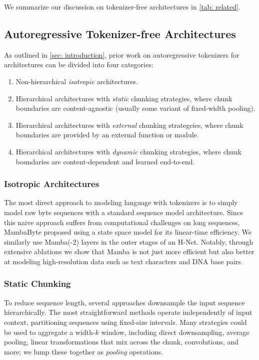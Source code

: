 We summarize our discussion on tokenizer-free architectures in \cref{tab: related}.

\subsection{Autoregressive Tokenizer-free Architectures}
\label{sec:background:ar} 


As outlined in \cref{sec: introduction}, prior work on autoregressive tokenizers for architectures can be divided into four categories:
\begin{enumerate}
    \item Non-hierarchical \emph{isotropic} architectures.
    \item Hierarchical architectures with \emph{static} chunking strategies, where chunk boundaries are content-agnostic (usually some variant of fixed-width pooling).
    \item Hierarchical architectures with \emph{external} chunking strategeies, where chunk boundaries are provided by an external function or module.
    \item Hierarchical architectures with \emph{dynamic} chunking strategies, where chunk boundaries are content-dependent and learned end-to-end.
\end{enumerate}

\subsubsection{Isotropic Architectures}
The most direct approach to modeling language with tokenizers is to simply model raw byte sequences with a standard sequence model architecture.
Since this naive approach suffers from computational challenges on long sequences, MambaByte \citep{MambaByte} proposed using a state space model for its linear-time efficiency.
We similarly use Mamba(-2) \citep{Mamba2} layers in the outer stages of an H-Net.
Notably, through extensive ablations we show that Mamba is not just more efficient but also better at modeling high-resolution data such as text characters and DNA base pairs.


\subsubsection{Static Chunking}

To reduce sequence length, several approaches downsample the input sequence hierarchically. 
The most straightforward methods operate independently of input context, partitioning sequences using fixed-size intervals.
Many strategies could be used to aggregate a width-$k$ window, including direct downsampling, average pooling, linear transformations that mix across the chunk, convolutions, and more; we lump these together as \emph{pooling} operations.


